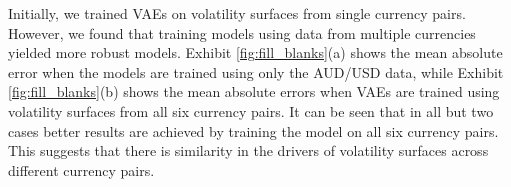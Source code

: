 \documentclass[12pt]{article}
\makeatletter
\newcommand{\specialcell}[2][c]{%
  \begin{tabular}[#1]{@{}c@{}}#2\end{tabular}}
\makeatother
\begin{document}
Initially, we trained VAEs on volatility surfaces from single currency pairs. However, we found that training models using data from multiple currencies yielded more robust models. Exhibit \ref{fig:fill_blanks}(a) shows the mean absolute error when the models are trained using only the AUD/USD data, while Exhibit \ref{fig:fill_blanks}(b) shows the mean absolute errors when VAEs are trained using volatility surfaces from all six currency pairs. It can be seen that in all but two cases better results are achieved by training the model on all six currency pairs. This suggests that there is similarity in the drivers of volatility surfaces across different currency pairs.


{
}
\end{document}

